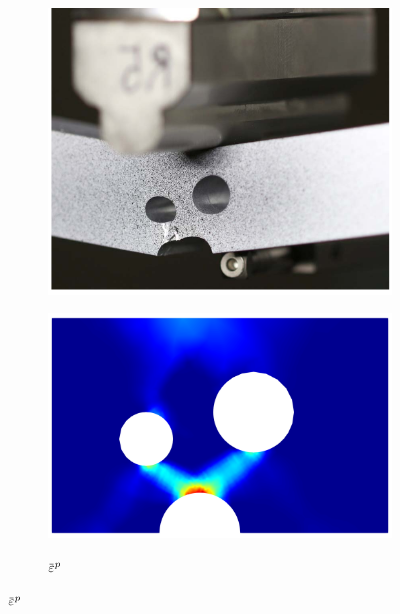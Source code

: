 \begin{figure}[!htb]
  \centering
  \begin{subfigure}[b]{0.3\textwidth}
    \centering
    \includegraphics[width=\textwidth,scale=0.5]{Chapter5/figures/3pb/real_crack}
    \caption{}
  \end{subfigure}
  \hspace{0.1\textwidth}
  \begin{subfigure}[b]{0.35\textwidth}
    \centering
    \includegraphics[width=\textwidth,scale=0.5]{Chapter5/figures/3pb/ep}
    \caption{}
  \end{subfigure}
  \begin{subfigure}[b]{0.06\textwidth}
    \centering
    \caption*{$\ep$}

\end{subfigure}
\end{figure}

